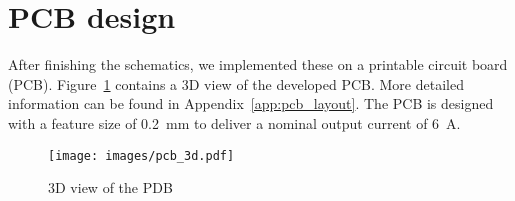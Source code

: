 \documentclass[11pt,titlepage]{report}
\begin{document}
\section{PCB design}
After finishing the schematics, we implemented these on a printable circuit board (PCB). Figure~\ref{fig:ass1-pcb-3d} contains a 3D view of the developed PCB. More detailed information can be found in Appendix~\ref{app:pcb_layout}. %
The PCB is designed with a feature size of \SI{0.2}{mm} to deliver a nominal output current of \SI{6}{A}.

\begin{figure}[H]
	\begin{center}
		\texttt{[image: images/pcb\_3d.pdf]}
	\end{center}
	\caption{3D view of the PDB}
	\label{fig:ass1-pcb-3d}
\end{figure}
\end{document}
